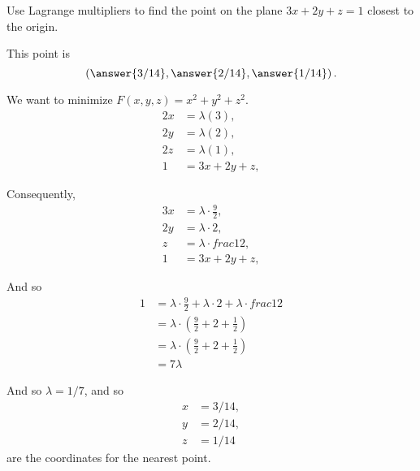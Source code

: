 \documentclass{ximera}
\author{Jim Fowler}
\begin{document}
\begin{exercise}
Use Lagrange multipliers to find the point on the plane $3x + 2y + z = 1$ closest to the origin.

This point is
\[
  \left( \answer{3/14}, \answer{2/14}, \answer{1/14} \right).
\]
  
\begin{hint}
  We want to minimize $F(x,y,z) = x^2 + y^2 + z^2$.
\begin{align*}
  2x &= \lambda( 3 ), \\
  2y &= \lambda( 2 ), \\
  2z &= \lambda( 1 ), \\
  1 &= 3x + 2y + z,
\end{align*}
\end{hint}

\begin{hint}
Consequently,
\begin{align*}
  3x &= \lambda \cdot \frac{9}{2}, \\
  2y &= \lambda \cdot 2, \\
  z &= \lambda \cdot frac{1}{2}, \\
  1 &= 3x + 2y + z,
\end{align*}
\end{hint}
\begin{hint}
And so
\begin{align*}
1
&= \lambda \cdot \frac{9}{2} + \lambda \cdot 2 + \lambda \cdot frac{1}{2} \\
&= \lambda \cdot \left( \frac{9}{2} + 2 + \frac{1}{2} \right) \\
&= \lambda \cdot \left( \frac{9}{2} + 2 + \frac{1}{2} \right) \\
&= 7 \lambda
\end{align*}
\end{hint}
\begin{hint}
And so $\lambda = 1/7$, and so
\begin{align*}
  x &= 3/14, \\
  y &= 2/14, \\
  z &= 1/14
\end{align*}
are the coordinates for the nearest point.
\end{hint}

\end{exercise}
\end{document}
